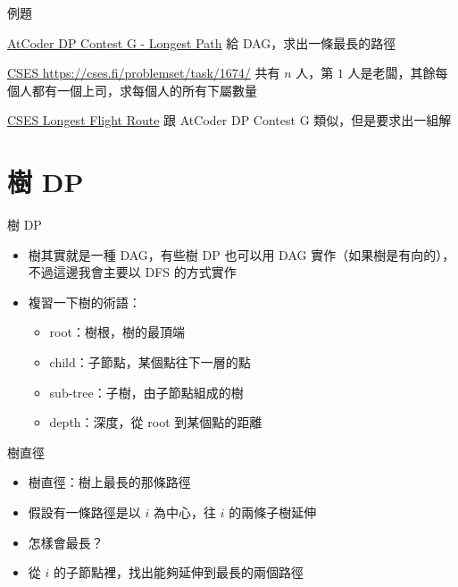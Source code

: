\documentclass[aspectratio=169]{beamer}
\begin{document}
    \begin{frame}{例題}
        \begin{block}{\href{https://atcoder.jp/contests/dp/tasks/dp_g}{AtCoder DP Contest G - Longest Path}}
            給 DAG，求出一條最長的路徑
        \end{block}

        \begin{block}{\href{https://cses.fi/problemset/task/1674/}{CSES https://cses.fi/problemset/task/1674/}}
            共有 $n$ 人，第 $1$ 人是老闆，其餘每個人都有一個上司，求每個人的所有下屬數量
        \end{block}

        \begin{block}{\href{https://cses.fi/problemset/task/1680/}{CSES Longest Flight Route}}
            跟 AtCoder DP Contest G 類似，但是要求出一組解
        \end{block}
    \end{frame}

    \section{樹 DP}

    \begin{frame}{樹 DP}
        \begin{itemize}
            \item 樹其實就是一種 DAG，有些樹 DP 也可以用 DAG 實作（如果樹是有向的），不過這邊我會主要以 DFS 的方式實作
            \item 複習一下樹的術語：
            \begin{itemize}
                \item root：樹根，樹的最頂端
                \item child：子節點，某個點往下一層的點
                \item sub-tree：子樹，由子節點組成的樹
                \item depth：深度，從 root 到某個點的距離
            \end{itemize}
        \end{itemize}
    \end{frame}

    \begin{frame}{樹直徑}
        \begin{itemize}
            \item<1-> 樹直徑：樹上最長的那條路徑
            \item<2-> 假設有一條路徑是以 $i$ 為中心，往 $i$ 的兩條子樹延伸
            \item<3-> 怎樣會最長？
            \item<4-> 從 $i$ 的子節點裡，找出能夠延伸到最長的兩個路徑
        \end{itemize}
    \end{frame}
\end{document}
